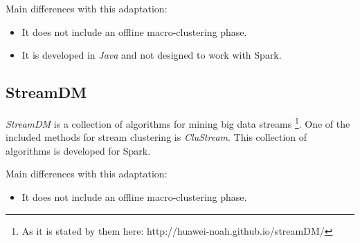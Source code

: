\documentclass[10pt, conference, compsocconf]{IEEEtran}
\begin{document}
Main differences with this adaptation: 

\begin{itemize}
 \item It does not include an offline macro-clustering phase.
 \item It is developed in \textit{Java} and not designed to work with Spark.
\end{itemize}

\subsection{StreamDM}

\textit{StreamDM} is a collection of algorithms for mining big data streams \footnote{As it is stated by them here: http://huawei-noah.github.io/streamDM/}. One of the included methods for stream clustering is \textit{CluStream}. This collection of algorithms is developed for Spark.

Main differences with this adaptation: 

\begin{itemize}
 \item It does not include an offline macro-clustering phase.
\end{itemize}

%
%

\end{document}
